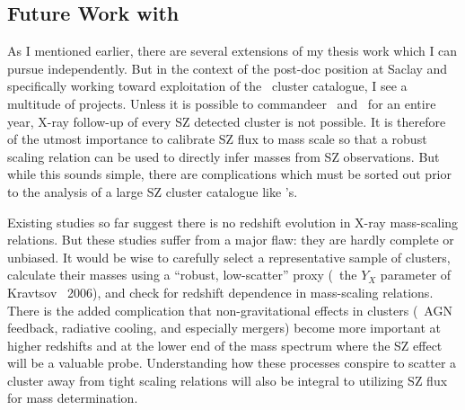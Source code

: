 \documentclass[11pt]{article}
\begin{document}
\subsection*{Future Work with \Planck}

As I mentioned earlier, there are several extensions of my thesis work
which I can pursue independently. But in the context of the post-doc
position at Saclay and specifically working toward exploitation of
the \Planck\ cluster catalogue, I see a multitude of projects. Unless
it is possible to commandeer \Xmm\ and \Chandra\ for an entire year,
X-ray follow-up of every SZ detected cluster is not possible. It is
therefore of the utmost importance to calibrate SZ flux to mass
scale so that a robust scaling relation can be used to directly infer
masses from SZ observations. But while this sounds simple, there are
complications which must be sorted out prior to the analysis of a
large SZ cluster catalogue like \Planck's.

Existing studies so far suggest there is no redshift evolution in
X-ray mass-scaling relations. But these studies suffer from a major
flaw: they are hardly complete or unbiased. It would be wise to
carefully select a representative sample of clusters, calculate their
masses using a ``robust, low-scatter'' proxy (\eg\ the $Y_X$
parameter of Kravtsov \etal\ 2006), and check for redshift dependence
in mass-scaling relations. There is the added complication that
non-gravitational effects in clusters (\ie\ AGN feedback, radiative
cooling, and especially mergers) become more important at higher
redshifts and at the lower end of the mass spectrum where the SZ
effect will be a valuable probe. Understanding how these processes
conspire to scatter a cluster away from tight scaling relations will
also be integral to utilizing SZ flux for mass determination.
\end{document}
